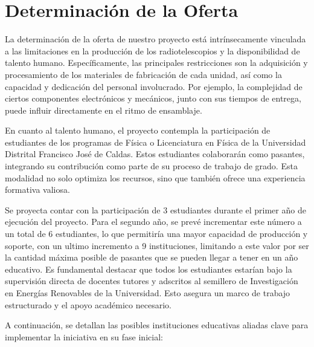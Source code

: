 \section{Determinación de la Oferta}%
\label{sec:Determinación de la Oferta}

La determinación de la oferta de nuestro proyecto está intrínsecamente
vinculada a las limitaciones en la producción de los radiotelescopios y la
disponibilidad de talento humano.
Específicamente, las principales restricciones son la adquisición y
procesamiento de los materiales de fabricación de cada unidad, así como la
capacidad y dedicación del personal involucrado.
Por ejemplo, la complejidad de ciertos componentes electrónicos y mecánicos,
junto con sus tiempos de entrega, puede influir directamente en el ritmo de
ensamblaje.

En cuanto al talento humano, el proyecto contempla la participación de
estudiantes de los programas de Física o Licenciatura en Física de la
Universidad Distrital Francisco José de Caldas.
Estos estudiantes colaborarán como pasantes, integrando su contribución como
parte de su proceso de trabajo de grado.
Esta modalidad no solo optimiza los recursos, sino que también ofrece una
experiencia formativa valiosa.

Se proyecta contar con la participación de 3 estudiantes durante el primer
año de ejecución del proyecto.
Para el segundo año, se prevé incrementar este número a un total de 6
estudiantes, lo que permitiría una mayor capacidad de producción y soporte,
con un ultimo incremento a 9 instituciones, limitando a este valor por ser
la cantidad máxima posible de pasantes que se pueden llegar a tener en un
año educativo.
Es fundamental destacar que todos los estudiantes estarían bajo la supervisión
directa de docentes tutores y adscritos al semillero de Investigación en
Energías Renovables de la Universidad.
Esto asegura un marco de trabajo estructurado y el apoyo académico necesario.

A continuación, se detallan las posibles instituciones educativas aliadas clave
para implementar la iniciativa en su fase inicial:

